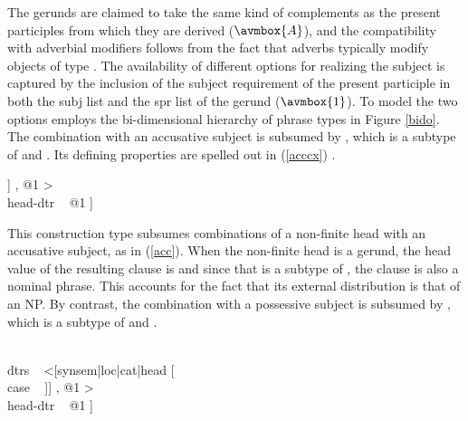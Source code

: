 \documentclass[output=paper]{langsci/langscibook}
\begin{document}
\noindent
The gerunds are claimed to take the same kind of complements 
as the present participles from which they are derived ($\avmbox{A}$), and
the compatibility with adverbial modifiers follows from the 
fact that adverbs typically modify objects of type . 
The availability of different options for realizing the subject is 
captured by the inclusion of the subject requirement of the present 
participle in both the {\sc subj} list and the {\sc spr} list of the gerund
($\avmbox{1}$). To model the two options \citet[15]{Malouf00} employs the  
bi-dimensional hierarchy of phrase types in Figure \ref{bido}. 
The combination with an accusative subject
is subsumed by , which is a subtype of 
 and . Its defining properties are 
spelled out in (\ref{acccx}) \citep[16]{Malouf00}. 

\begin{exe}
\ex\label{acccx} 
\begin{avm} 
[\type{nonfin-head-subj-cx}                  \\
 synsem|loc|cat|head|root ~ --                \\
 dtrs ~ <[synsem|loc|cat|head [\type{noun}   \\
                               case ~ \type{acc}]] , @1 > \\
 head-dtr ~ @1 ] 
\end{avm}
\end{exe} 

\noindent
This construction type subsumes combinations of a non-finite head with 
an accusative subject, as in (\ref{acc}). When the non-finite head is a gerund, 
the {\sc head} value of the resulting clause is  
and since that is a subtype of , the clause is also a nominal phrase. 
This accounts for the fact that its external distribution is that of an NP.  
By contrast, the combination with a possessive subject
is subsumed by , which is a subtype of 
 and  \citep[16]{Malouf00}.

\begin{exe} 
\ex\label{gencx} 
\begin{avm} 
[\type{noun-poss-cx}                                      \\
 synsem|loc [cat|head ~ \type{noun}                       \\
             content ~ \type{nom-obj}]                    \\
 dtrs ~ <[synsem|loc|cat|head [                \\
                               case ~ ]] , @1 > \\
 head-dtr ~ @1 ] 
\end{avm}
\end{exe}
 
\end{document}
